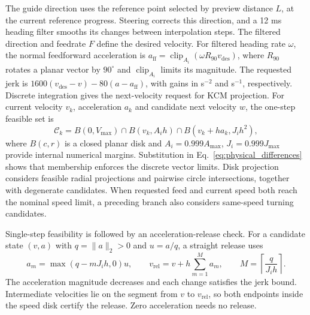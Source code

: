\documentclass[preprint,12pt]{elsarticle}
\begin{document}
The guide direction uses the reference point selected by preview distance $L$, at the current reference progress. Steering corrects this direction, and a 12 ms heading filter smooths its changes between interpolation steps. The filtered direction and feedrate $F$ define the desired velocity. For filtered heading rate $\omega$, the normal feedforward acceleration is $a_{\mathrm{ff}}=\operatorname{clip}_{A_i}(\omega R_{90}v_{\mathrm{des}})$, where $R_{90}$ rotates a planar vector by $90^\circ$ and $\operatorname{clip}_{A_i}$ limits its magnitude. The requested jerk is $1600(v_{\mathrm{des}}-v)-80(a-a_{\mathrm{ff}})$, with gains in s$^{-2}$ and s$^{-1}$, respectively. Discrete integration gives the next-velocity request for KCM projection. For current velocity $v_k$, acceleration $a_k$ and candidate next velocity $w$, the one-step feasible set is
\begin{equation}
\mathcal C_k=B(0,V_{\max})\cap B(v_k,A_i h)\cap B(v_k+h a_k,J_i h^2),
\label{eq:disks_main}
\end{equation}
where $B(c,r)$ is a closed planar disk and $A_i=0.999A_{\max}$, $J_i=0.999J_{\max}$ provide internal numerical margins. Substitution in Eq.~\eqref{eq:physical_differences} shows that membership enforces the discrete vector limits. Disk projection considers feasible radial projections and pairwise circle intersections, together with degenerate candidates. When requested feed and current speed both reach the nominal speed limit, a preceding branch also considers same-speed turning candidates.

Single-step feasibility is followed by an acceleration-release check. For a candidate state $(v,a)$ with $q=\|a\|_2>0$ and $u=a/q$, a straight release uses
\begin{equation}
a_m=\max(q-mJ_i h,0)u,\qquad
v_{\mathrm{rel}}=v+h\sum_{m=1}^{M}a_m,\qquad
M=\left\lceil\frac{q}{J_i h}\right\rceil.
\label{eq:release_main}
\end{equation}
The acceleration magnitude decreases and each change satisfies the jerk bound. Intermediate velocities lie on the segment from $v$ to $v_{\mathrm{rel}}$, so both endpoints inside the speed disk certify the release. Zero acceleration needs no release.
\end{document}
